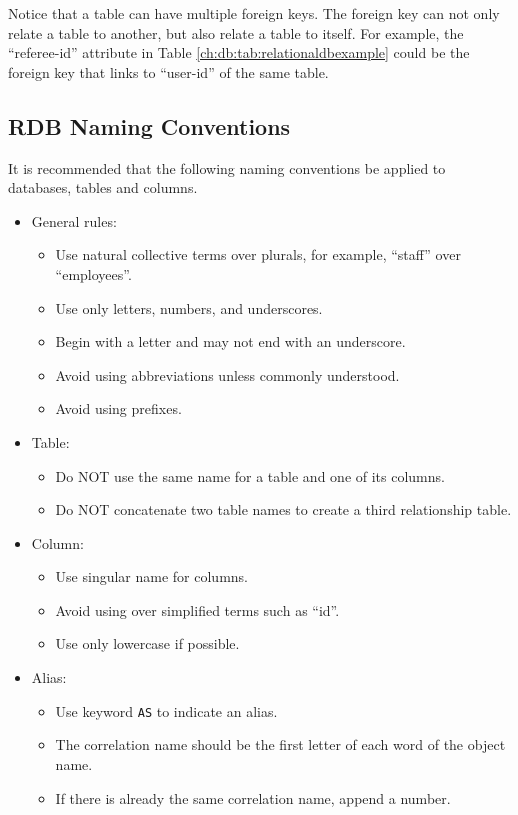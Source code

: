 Notice that a table can have multiple foreign keys. The foreign key can not only relate a table to another, but also relate a table to itself. For example, the ``referee-id'' attribute in Table \ref{ch:db:tab:relationaldbexample} could be the foreign key that links to ``user-id'' of the same table.

\subsection{RDB Naming Conventions}

It is recommended that the following naming conventions be applied to databases, tables and columns.
\begin{itemize}
\item General rules:
\begin{itemize}
\item Use natural collective terms over plurals, for example, ``staff'' over ``employees''.
\item Use only letters, numbers, and underscores.
\item Begin with a letter and may not end with an underscore.
\item Avoid using abbreviations unless commonly understood.
\item Avoid using prefixes.
\end{itemize}
\item Table:
\begin{itemize}
	\item Do NOT use the same name for a table and one of its columns.
	\item Do NOT concatenate two table names to create a third relationship table.
\end{itemize}
\item Column:
\begin{itemize}
	\item Use singular name for columns.
	\item Avoid using over simplified terms such as ``id''.
	\item Use only lowercase if possible.
\end{itemize}
\item Alias:
\begin{itemize}
	\item Use keyword \verb|AS| to indicate an alias.
	\item The correlation name should be the first letter of each word of the object name.
	\item If there is already the same correlation name, append a number.

\end{itemize}
\end{itemize}
